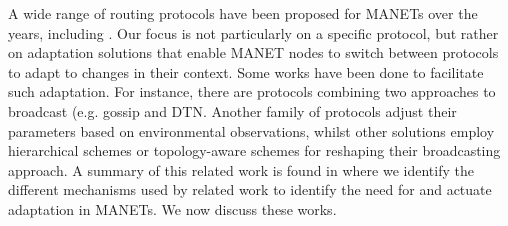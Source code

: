 
A wide range of routing protocols have been proposed for MANETs over the years, including . Our focus is not particularly on a specific protocol, but rather on adaptation solutions that enable MANET nodes to switch between protocols to adapt to changes in their context. 
Some works have been done to facilitate such adaptation. 
For instance, there are protocols combining two approaches to broadcast (e.g. gossip and DTN. Another family of protocols adjust their parameters based on environmental observations, whilst other solutions employ hierarchical schemes or topology-aware schemes for reshaping their broadcasting approach. 
A summary of this related work is found in  where we identify the different mechanisms used by related work to identify the need for and actuate adaptation in MANETs. 
We now discuss these works.

